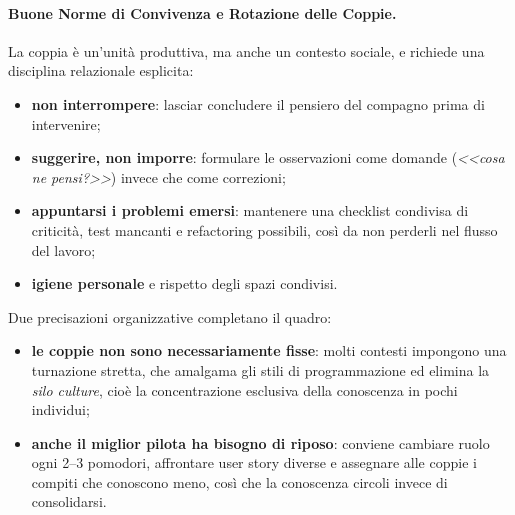 \documentclass[12pt]{extarticle}
\begin{document}
\paragraph{Buone Norme di Convivenza e Rotazione delle Coppie.}
La coppia è un'unità produttiva, ma anche un contesto sociale, e richiede una disciplina relazionale esplicita:
\begin{itemize}
    \item \textbf{non interrompere}: lasciar concludere il pensiero del compagno prima di intervenire;
    \item \textbf{suggerire, non imporre}: formulare le osservazioni come domande (\textit{<<cosa ne pensi?>>}) invece che come correzioni;
    \item \textbf{appuntarsi i problemi emersi}: mantenere una checklist condivisa di criticità, test mancanti e refactoring possibili, così da non perderli nel flusso del lavoro;
    \item \textbf{igiene personale} e rispetto degli spazi condivisi.
\end{itemize}

\noindent Due precisazioni organizzative completano il quadro:
\begin{itemize}
    \item \textbf{le coppie non sono necessariamente fisse}: molti contesti impongono una turnazione stretta, che amalgama gli stili di programmazione ed elimina la \textit{silo culture}, cioè la concentrazione esclusiva della conoscenza in pochi individui;
    \item \textbf{anche il miglior pilota ha bisogno di riposo}: conviene cambiare ruolo ogni 2--3 pomodori, affrontare user story diverse e assegnare alle coppie i compiti che conoscono meno, così che la conoscenza circoli invece di consolidarsi.
\end{itemize}
\end{document}
